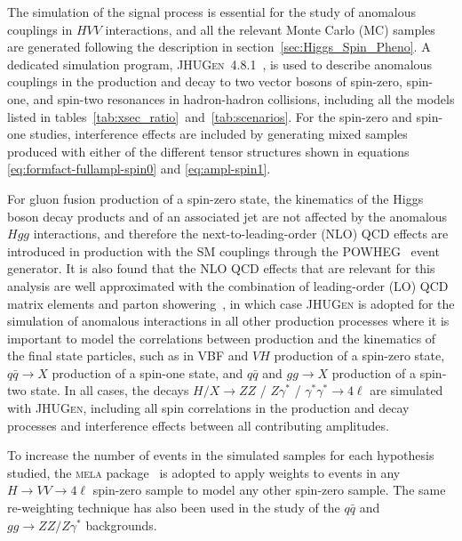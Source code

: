 The simulation of the signal process is essential for the study of anomalous couplings in $HVV$ interactions, and all the relevant Monte Carlo (MC) samples are generated following the description in section~\ref{sec:Higgs_Spin_Pheno}. A dedicated simulation program, \textsc{JHUGen}~4.8.1~\cite{Gao:2010qx,Bolognesi:2012mm,Anderson:2013afp}, is used to describe anomalous couplings in the production and decay to two vector bosons of spin-zero, spin-one, and spin-two resonances in hadron-hadron collisions, including all the models listed in tables~\ref{tab:xsec_ratio}~and~\ref{tab:scenarios}. For the spin-zero and spin-one studies, interference effects are included by generating mixed samples produced with either of the different tensor structures shown in equations \eqref{eq:formfact-fullampl-spin0} and \eqref{eq:ampl-spin1}.


For gluon fusion production of a spin-zero state, the kinematics of the Higgs boson decay products and of an associated jet are not affected by the anomalous $Hgg$ interactions, and therefore the next-to-leading-order (NLO) QCD effects are introduced in production with the SM couplings through the \textsc{POWHEG}~\cite{Frixione:2007vw,Bagnaschi:2011tu,Nason:2009ai} event generator. It is also found that the NLO QCD effects that are relevant for this analysis are well approximated with the combination of leading-order (LO) QCD matrix elements and parton showering~\cite{Anderson:2013afp}, in which case \textsc{JHUGen} is adopted for the simulation of anomalous interactions in all other production processes where it is important to model the correlations between production and the kinematics of the final state particles, such as in VBF and $VH$ production of a spin-zero state, $q\bar{q} \to X$ production of a spin-one state, and $q\bar{q}$ and $gg \to X$ production of a spin-two state. In all cases, the decays $H/X \to ZZ$ / $Z\gamma^*$ / $\gamma^*\gamma^*\to4\ell$ are simulated with \textsc{JHUGen}, including all spin correlations in the production and decay processes and interference effects between all contributing amplitudes.

To increase the number of events in the simulated samples for each hypothesis studied, the \textsc{mela} package~\cite{Chatrchyan:2012ufa,Gao:2010qx,Bolognesi:2012mm,Anderson:2013afp} is adopted to apply weights to events in any $H \to V V \to4\ell$ spin-zero sample to model any other spin-zero sample. The same re-weighting technique has also been used in the study of the $q\bar{q}$ and $gg \to ZZ/Z\gamma^*$ backgrounds.


